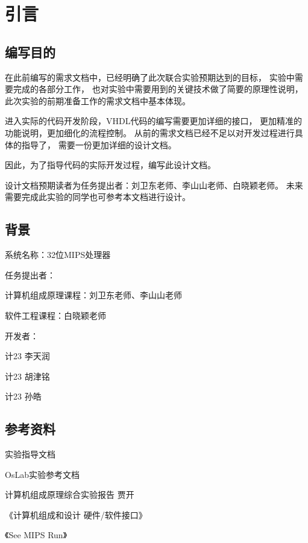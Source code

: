 \section{引言}
    \subsection{编写目的}
        在此前编写的需求文档中，已经明确了此次联合实验预期达到的目标，%
        实验中需要完成的各部分工作，%
        也对实验中需要用到的关键技术做了简要的原理性说明，%
        此次实验的前期准备工作的需求文档中基本体现。

        进入实际的代码开发阶段，VHDL代码的编写需要更加详细的接口，%
        更加精准的功能说明，更加细化的流程控制。%
        从前的需求文档已经不足以对开发过程进行具体的指导了，%
        需要一份更加详细的设计文档。

        因此，为了指导代码的实际开发过程，编写此设计文档。

        设计文档预期读者为任务提出者：刘卫东老师、李山山老师、白晓颖老师。%
        未来需要完成此实验的同学也可参考本文档进行设计。

    \subsection{背景}
        系统名称：32位MIPS处理器

        任务提出者：
        \begin{minipage}[t]{0.8\linewidth}
        计算机组成原理课程：刘卫东老师、李山山老师

        软件工程课程：白晓颖老师
        \end{minipage}
        

        开发者：
        \begin{minipage}[t]{0.8\linewidth}
        计23 李天润

        计23 胡津铭

        计23 孙皓
        \end{minipage}

    \subsection{参考资料}
        实验指导文档

        OsLab实验参考文档

        计算机组成原理综合实验报告 贾开

        《计算机组成和设计 硬件/软件接口》

        《See MIPS Run》


